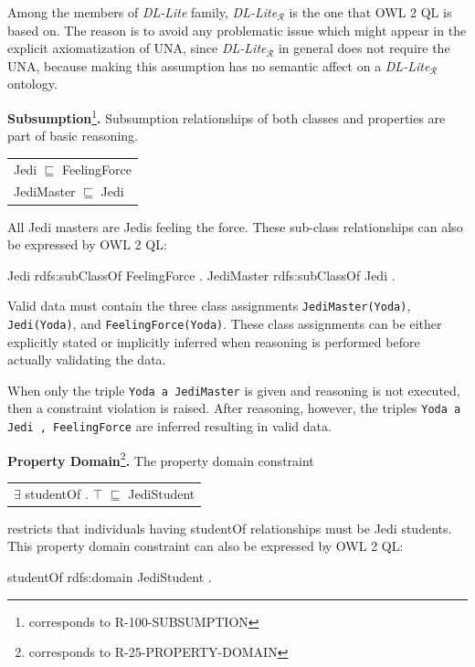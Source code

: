 \documentclass{llncs}
\newcommand{\ms}[1]{\texttt{#1}}
\newenvironment{DL}{
  \scriptsize
  \sffamily
  \vspace{0.3cm}
  \begin{tabular}{l}

}{
  \end{tabular}
  \linebreak
}
\begin{document}
Among the members of \textit{DL-Lite} family, \textit{DL-Lite}$_\mathcal{R}$ is the one that OWL 2 QL is based on. The reason is to avoid any problematic issue which might appear in the explicit axiomatization of UNA, since  \textit{DL-Lite}$_\mathcal{R}$ in general does not require the UNA, because making this assumption has no semantic affect on a \textit{DL-Lite}$_\mathcal{R}$ ontology.

\textbf{Subsumption}\footnote{corresponds to R-100-SUBSUMPTION}\textbf{.}
Subsumption relationships of both classes and properties are part of basic reasoning.

\begin{DL}
Jedi $\sqsubseteq$ FeelingForce \\
JediMaster $\sqsubseteq$ Jedi \\
\end{DL}

All Jedi masters are Jedis feeling the force.
These sub-class relationships can also be expressed by OWL 2 QL:

\begin{ex}
Jedi rdfs:subClassOf FeelingForce . 
JediMaster rdfs:subClassOf Jedi . 
\end{ex}

Valid data must contain the three class assignments \ms{JediMaster(Yoda)}, \ms{Jedi(Yoda)}, and \ms{FeelingForce(Yoda)}.
These class assignments can be either explicitly stated or implicitly inferred when reasoning is performed before actually validating the data.

When only the triple \ms{Yoda a JediMaster} is given and reasoning is not executed, then a constraint violation is raised.
After reasoning, however, the triples \ms{Yoda a Jedi , FeelingForce} are inferred resulting in valid data. 

\textbf{Property Domain}\footnote{corresponds to R-25-PROPERTY-DOMAIN}\textbf{.}
The property domain constraint

\begin{DL}
$\exists$ studentOf . $\top$ $\sqsubseteq$ JediStudent \\
\end{DL}

restricts that individuals having studentOf relationships must be Jedi students.
This property domain constraint can also be expressed by OWL 2 QL:

\begin{ex}
studentOf rdfs:domain JediStudent .
\end{ex}
\end{document}
